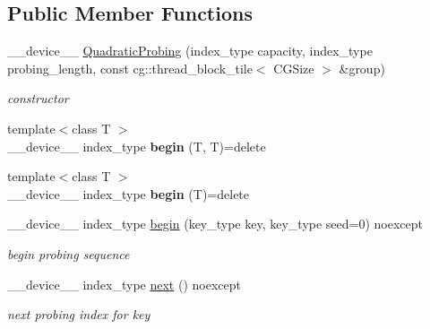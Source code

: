 \subsection*{Public Member Functions}
\begin{DoxyCompactItemize}
\item 
\+\_\+\+\_\+device\+\_\+\+\_\+ \hyperlink{classwarpcore_1_1probing__schemes_1_1QuadraticProbing_a90404a96e73f9914e7ea9b80b15895fa}{Quadratic\+Probing} (index\+\_\+type capacity, index\+\_\+type probing\+\_\+length, const cg\+::thread\+\_\+block\+\_\+tile$<$ C\+G\+Size $>$ \&group)
\begin{DoxyCompactList}\small\item\em constructor \end{DoxyCompactList}\item 
\mbox{\label{classwarpcore_1_1probing__schemes_1_1QuadraticProbing_a396cb5e5d02bb51e4daf98262c888a2d}} 
{\footnotesize template$<$class T $>$ }\\\+\_\+\+\_\+device\+\_\+\+\_\+ index\+\_\+type {\bfseries begin} (T, T)=delete
\item 
\mbox{\label{classwarpcore_1_1probing__schemes_1_1QuadraticProbing_aa48368d2e17761f75a351fde399c51bd}} 
{\footnotesize template$<$class T $>$ }\\\+\_\+\+\_\+device\+\_\+\+\_\+ index\+\_\+type {\bfseries begin} (T)=delete
\item 
\+\_\+\+\_\+device\+\_\+\+\_\+ index\+\_\+type \hyperlink{classwarpcore_1_1probing__schemes_1_1QuadraticProbing_a3468f7aba9ead442bb79385312d38b23}{begin} (key\+\_\+type key, key\+\_\+type seed=0) noexcept
\begin{DoxyCompactList}\small\item\em begin probing sequence \end{DoxyCompactList}\item 
\+\_\+\+\_\+device\+\_\+\+\_\+ index\+\_\+type \hyperlink{classwarpcore_1_1probing__schemes_1_1QuadraticProbing_ad19ec9917173a2e4a1381f8848a367b8}{next} () noexcept
\begin{DoxyCompactList}\small\item\em next probing index for {\ttfamily key} \end{DoxyCompactList}\end{DoxyCompactItemize}
